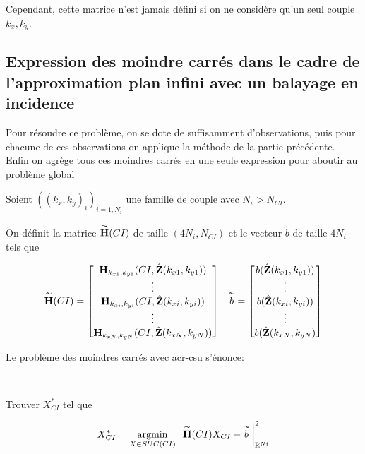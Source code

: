   Cependant, cette matrice n'est jamais défini si on ne considère qu'un seul couple \(k_x, k_y\).

\subsection{Expression des moindre carrés dans le cadre de l'approximation plan infini avec un balayage en incidence}

  Pour résoudre ce problème, on se dote de suffisamment d'observations, puis pour chacune de ces observations on applique la méthode de la partie précédente. Enfin on agrège tous ces moindres carrés en une seule expression pour aboutir au problème global

  Soient \(((k_x,k_y)_i)_{i=1,N_{i}}\) une famille de couple avec \(N_{i} > N_{CI}\).

  \begin{defn}
    On définit la matrice \(\overset{\thicksim}{\mathbf{H}}(CI)\) de taille \((4N_{i},N_{CI})\) et le vecteur \(\tilde{b}\) de taille \(4N_{i}\) tels que

  \begin{align}
    \overset{\thicksim}{\mathbf{H}}(CI) = \begin{bmatrix}
      \mathbf{H}_{k_{x1},k_{y1}} (CI,\hat{\mathbf{Z}}(k_{x1},k_{y1}))
      \\
      \vdots
      \\
      \mathbf{H}_{k_{xi},k_{yi}} (CI,\hat{\mathbf{Z}}(k_{xi},k_{yi}))
      \\
      \vdots
      \\
      \mathbf{H}_{k_{xN},k_{yN}} (CI,\hat{\mathbf{Z}}(k_{xN},k_{yN}))
      \end{bmatrix}
    &&
    \overset{\thicksim}{b} = \begin{bmatrix}
     b(\hat{\mathbf{Z}}(k_{x1},k_{y1}))
     \\ 
     \vdots 
     \\ 
     b(\hat{\mathbf{Z}}(k_{xi},k_{yi}))
     \\
     \vdots
     \\ 
     b(\hat{\mathbf{Z}}(k_{xN},k_{yN})
     \end{bmatrix}
  \end{align}
  \end{defn}

  Le problème des moindres carrés avec \gls{acr-csu} s'énonce:

  \begin{prop}
  ~

  Trouver \(X_{CI}^*\) tel que

  \[
    X_{CI}^* = {\underset{X \in SUC(CI)}{\operatorname{argmin}}} \left\lVert \overset{\thicksim}{\mathbf{H}}(CI)X_{CI} - \overset{\thicksim}{b}\right\rVert^2_{\mathbb R^{Ni}}
  \]
  \end{prop}

